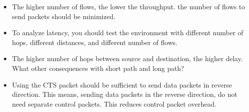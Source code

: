 \documentclass{article}
\begin{document}
\begin{itemize}
  \item The higher number of flows, the lower the throughput. the number of flows to send packets should be minimized.
  \item To analyze latency, you should test the environment with different number of hops, different distances, and different number of flows. 
  \item The higher number of hops between source and destination, the higher delay. What other consequences with short path and long path?
  \item Using the CTS packet should be sufficient to send data packets in reverse direction. This means, sending data packets in the reverse direction, do not need separate control packets. This reduces control packet overhead. \\
  

\end{itemize}
\end{document}
